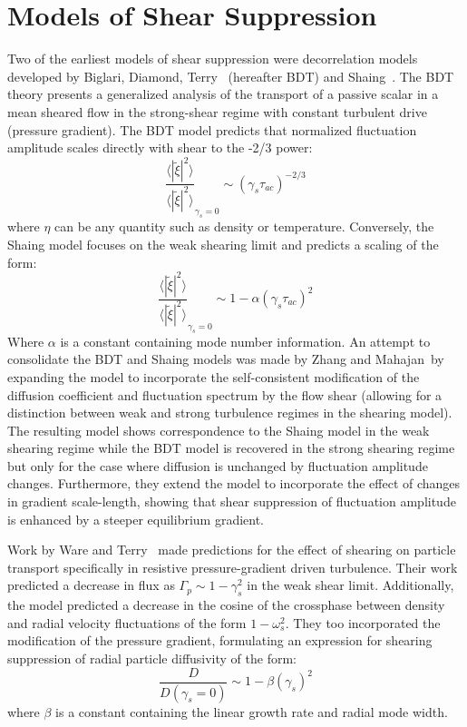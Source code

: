 \documentclass[aip,pop,amsmath,amssymb,preprint,superscriptaddress]{revtex4-1} %
\begin{document}
\section{Models of Shear Suppression}

Two of the earliest models of shear suppression were decorrelation models developed by Biglari, Diamond, Terry~\cite{biglari90} (hereafter BDT) and Shaing~\cite{shaing90}. The BDT theory presents a generalized analysis of the transport of a passive scalar in a mean sheared flow in the strong-shear regime with constant turbulent drive (pressure gradient). The BDT model predicts that normalized fluctuation amplitude scales directly with shear to the -2/3 power:
%
\begin{equation}
\frac{\langle |\tilde{\xi}|^{2} \rangle}{\langle |\tilde{\xi}|^{2} \rangle}_{\gamma_{s}=0} \sim (\gamma_{s}\tau_{ac})^{-2/3}
\label{eq:BDT_theory}
\end{equation}
%
where $\eta$ can be any quantity such as density or temperature. Conversely, the Shaing model focuses on the weak shearing limit and predicts a scaling of the form:
%
\begin{equation}
\frac{\langle |\tilde{\xi}|^{2} \rangle}{\langle |\tilde{\xi}|^{2} \rangle}_{\gamma_{s}=0} \sim 1- \alpha(\gamma_{s}\tau_{ac})^2
\label{eq:shaing_theory}
\end{equation}
%
Where $\alpha$ is a constant containing mode number information. An attempt to consolidate the BDT and Shaing models was made by Zhang and Mahajan~\cite{zhang92,zhang93}by expanding the model to incorporate the self-consistent modification of the diffusion coefficient and fluctuation spectrum by the flow shear (allowing for a distinction between weak and strong turbulence regimes in the shearing model). The resulting model shows correspondence to the Shaing model in the weak shearing regime while the BDT model is recovered in the strong shearing regime but only for the case where diffusion is unchanged by fluctuation amplitude changes. Furthermore, they extend the model to incorporate the effect of changes in gradient scale-length, showing that shear suppression of fluctuation amplitude is enhanced by a steeper equilibrium gradient. 

Work by Ware and Terry~\cite{ware96,ware98} made predictions for the effect of shearing on particle transport specifically in resistive pressure-gradient driven turbulence. Their work predicted a decrease in flux as $\Gamma_{p} \sim 1-\gamma_{s}^2$ in the weak shear limit.  Additionally,  the model predicted a decrease in the cosine of the crossphase between density and radial velocity fluctuations of the form $1-\omega_{s}^2$. They too incorporated the modification of the pressure gradient, formulating an expression for shearing suppression of radial particle diffusivity of the form:
%
\begin{equation}
\frac{D}{D(\gamma_{s}=0)} \sim 1-\beta(\gamma_{s})^2
\label{eq:ware_diff_theory}
\end{equation}
%
where $\beta$ is a constant containing the linear growth rate and radial mode width.
\end{document}
